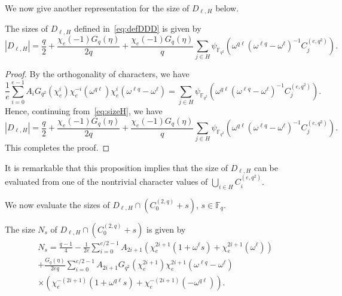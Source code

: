 \documentclass[ALCO,ThmDefs,Unicode]{cedram}
\newcommand*\F{{\mathbb F}}
\begin{document}
We now give another representation for the size of $D_{\ell,H}$ below.

\begin{prop}\label{prop:size_charac}
The sizes of $D_{\ell,H}$ defined in~\eqref{eq:defDDD} is given by
\[
|D_{\ell,H}|=\frac{q}{2}+\frac{\chi_e(-1)G_q(\eta)}{2q}+\frac{\chi_e(-1)G_q(\eta)}{q}\sum_{j\in H}\psi_{\F_{q^2}}(\omega^{q\ell}(\omega^{\ell q}-\omega^{\ell})^{-1}C_j^{(e,q^2)}).
\]
\end{prop}
\begin{proof}
By the orthogonality of characters, we have
\[
\frac{1}{e}\sum_{i=0}^{e-1} A_i G_{q^2}(\chi_e^{i})\chi_e^{-i}(\omega^{q\ell})\chi_e^{i}(\omega^{\ell q}-\omega^{\ell})=\sum_{j\in H}\psi_{\F_{q^2}}(\omega^{q\ell}(\omega^{\ell q}-\omega^{\ell})^{-1}C_j^{(e,q^2)}).
\]
Hence, continuing from~\eqref{eq:sizeH}, we have
\[
|D_{\ell,H}|=\frac{q}{2}+\frac{\chi_e(-1)G_q(\eta)}{2q}+\frac{\chi_e(-1)G_q(\eta)}{q}\sum_{j\in H}\psi_{\F_{q^2}}(\omega^{q\ell}(\omega^{\ell q}-\omega^{\ell})^{-1}C_j^{(e,q^2)}).
\]
This completes the proof.
\end{proof}

It is remarkable that this proposition implies that the size of $D_{\ell,H}$ can be evaluated from one of the nontrivial character values of $\bigcup_{i\in H}C_i^{(e,q^2)}$.

We now evaluate the sizes of $D_{\ell,H}\cap (C_0^{(2,q)}+s)$, $s\in \F_q$.

\begin{prop}\label{prop:size:int}
The size $N_s$ of $D_{\ell,H}\cap (C_0^{(2,q)}+s)$ is given by
\begin{multline}
N_s=\frac{q-1}{4}-\frac{1}{2e}\sum_{i=0}^{e/2-1} A_{2i+1}(\chi_e^{2i+1}(1+\omega^\ell s)+\chi_e^{2i+1}(\omega^\ell))\\
+\frac{G_q(\eta)}{2eq}\sum_{i=0}^{e/2-1}A_{2i+1} G_{q^2}(\chi_e^{2i+1})\chi_e^{2i+1}(\omega^{\ell q}-\omega^\ell)\\
\times (\chi_e^{-(2i+1)}(1+\omega^{q\ell} s)+\chi_e^{-(2i+1)}(-\omega^{q\ell})).\label{eq:sizeNs}
\end{multline}
\end{prop}
\end{document}
